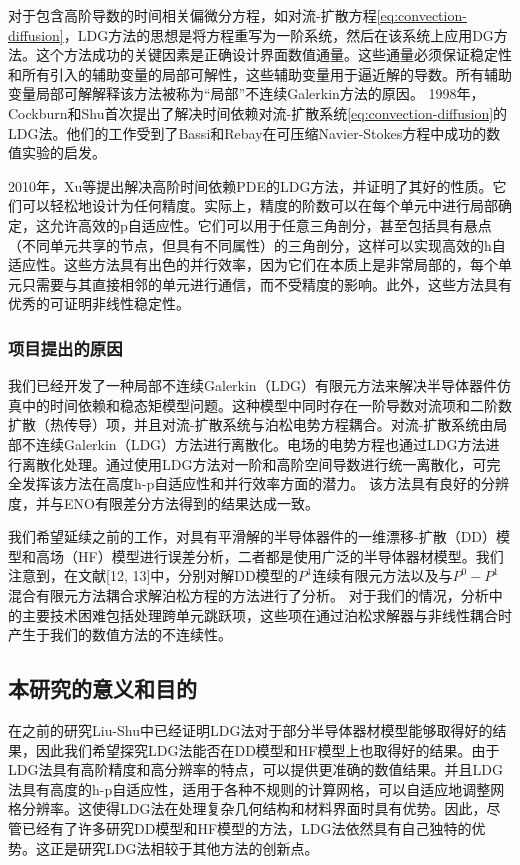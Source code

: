 对于包含高阶导数的时间相关偏微分方程，如对流-扩散方程\eqref{eq:convection-diffusion}，LDG方法的思想是将方程重写为一阶系统，然后在该系统上应用DG方法。这个方法成功的关键因素是正确设计界面数值通量。这些通量必须保证稳定性和所有引入的辅助变量的局部可解性，这些辅助变量用于逼近解的导数。所有辅助变量局部可解解释该方法被称为“局部”不连续Galerkin方法的原因\cite{cockburn1998local}。
1998年，Cockburn和Shu首次提出了解决时间依赖对流-扩散系统\autoref{eq:convection-diffusion}的LDG法\cite{cockburn1998local}。他们的工作受到了Bassi和Rebay在可压缩Navier-Stokes方程中成功的数值实验的启发\cite{bassi1997high}。

2010年，Xu等提出解决高阶时间依赖PDE的LDG方法\cite{xu2010local}，并证明了其好的性质。它们可以轻松地设计为任何精度。实际上，精度的阶数可以在每个单元中进行局部确定，这允许高效的p自适应性。它们可以用于任意三角剖分，甚至包括具有悬点（不同单元共享的节点，但具有不同属性）的三角剖分，这样可以实现高效的h自适应性。这些方法具有出色的并行效率，因为它们在本质上是非常局部的，每个单元只需要与其直接相邻的单元进行通信，而不受精度的影响。此外，这些方法具有优秀的可证明非线性稳定性。

\subsubsection{项目提出的原因}
我们已经开发了一种局部不连续Galerkin（LDG）有限元方法来解决半导体器件仿真中的时间依赖和稳态矩模型问题\cite{liu2004local,liu2007locala}。这种模型中同时存在一阶导数对流项和二阶数扩散（热传导）项，并且对流-扩散系统与泊松电势方程耦合。对流-扩散系统由局部不连续Galerkin（LDG）方法进行离散化。电场的电势方程也通过LDG方法进行离散化处理。通过使用LDG方法对一阶和高阶空间导数进行统一离散化，可完全发挥该方法在高度h-p自适应性和并行效率方面的潜力。
该方法具有良好的分辨度\cite{liu2004local,liu2007locala}，并与ENO有限差分方法\cite{jerome1994energy}得到的结果达成一致。

我们希望延续之前的工作\cite{liu2004local,liu2007locala}，对具有平滑解的半导体器件的一维漂移-扩散（DD）模型和高场（HF）模型进行误差分析，二者都是使用广泛的半导体器材模型。我们注意到，在文献[12, 13]中，分别对解DD模型的$P^1$连续有限元方法以及与$P^0-P^1$混合有限元方法耦合求解泊松方程的方法进行了分析。
对于我们的情况，分析中的主要技术困难包括处理跨单元跳跃项，这些项在通过泊松求解器与非线性耦合时产生于我们的数值方法的不连续性。
\subsection{本研究的意义和目的}
在之前的研究Liu-Shu中已经证明LDG法对于部分半导体器材模型能够取得好的结果，因此我们希望探究LDG法能否在DD模型和HF模型上也取得好的结果。由于LDG法具有高阶精度和高分辨率的特点，可以提供更准确的数值结果。并且LDG法具有高度的h-p自适应性，适用于各种不规则的计算网格，可以自适应地调整网格分辨率。这使得LDG法在处理复杂几何结构和材料界面时具有优势。因此，尽管已经有了许多研究DD模型和HF模型的方法，LDG法依然具有自己独特的优势。这正是研究LDG法相较于其他方法的创新点。